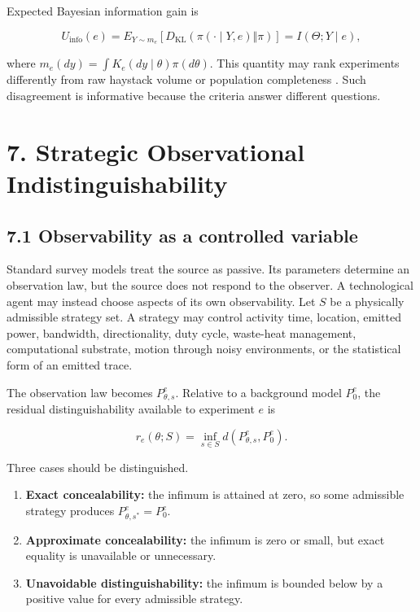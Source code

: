 \documentclass[11pt,a4paper]{article}
\begin{document}
Expected Bayesian information gain is

\begin{equation}
U_{\mathrm{info}}(e)
=E_{Y\sim m_e}
\left[D_{\mathrm{KL}}\!\left(\pi(\cdot\mid Y,e)\Vert\pi\right)\right]
=I(\Theta;Y\mid e),
\end{equation}

where \(m_e(dy)=\int K_e(dy\mid\theta)\pi(d\theta)\). This quantity may rank experiments differently from raw haystack volume or population completeness \citep{lindley1956,chalonerverdinelli1995}. Such disagreement is informative because the criteria answer different questions.

\section{7. Strategic Observational Indistinguishability}\label{7-strategic-observational-indistinguishability}

\subsection{7.1 Observability as a controlled variable}\label{71-observability-as-a-controlled-variable}

Standard survey models treat the source as passive. Its parameters determine an observation law, but the source does not respond to the observer. A technological agent may instead choose aspects of its own observability. Let \(S\) be a physically admissible strategy set. A strategy may control activity time, location, emitted power, bandwidth, directionality, duty cycle, waste-heat management, computational substrate, motion through noisy environments, or the statistical form of an emitted trace.

The observation law becomes \(P^e_{\theta,s}\). Relative to a background model \(P^e_0\), the residual distinguishability available to experiment \(e\) is

\begin{equation}
r_e(\theta;S)=\inf_{s\in S}d(P^e_{\theta,s},P^e_0).
\end{equation}

Three cases should be distinguished.

\begin{enumerate}
\def\labelenumi{\arabic{enumi}.}
\item
  \textbf{Exact concealability:} the infimum is attained at zero, so some admissible strategy produces \(P^e_{\theta,s^*}=P^e_0\).
\item
  \textbf{Approximate concealability:} the infimum is zero or small, but exact equality is unavailable or unnecessary.
\item
  \textbf{Unavoidable distinguishability:} the infimum is bounded below by a positive value for every admissible strategy.
\end{enumerate}
\end{document}
